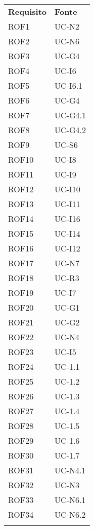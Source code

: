 \begin{longtable}{| p{5cm} | p{5cm} |}
		\rowcolor{LightBlue}
		\color{white}\bfseries Requisito & \color{white}\bfseries Fonte \\[0.25cm]
		\rowcolor{LightGray}
		ROF1 & UC-N2\\
		ROF2 & UC-N6\\
		\rowcolor{LightGray}
		ROF3 & UC-G4\\
		ROF4 & UC-I6\\
		\rowcolor{LightGray}
		ROF5 & UC-I6.1\\
		ROF6 & UC-G4\\
		\rowcolor{LightGray}
		ROF7 & UC-G4.1\\
		ROF8 & UC-G4.2\\
		\rowcolor{LightGray}
		ROF9 & UC-S6\\
		ROF10 & UC-I8\\
		\rowcolor{LightGray}
		ROF11 & UC-I9\\
		ROF12 & UC-I10\\
		\rowcolor{LightGray}
		ROF13 & UC-I11\\
		ROF14 & UC-I16\\
		\rowcolor{LightGray}
		ROF15 & UC-I14\\
		ROF16 & UC-I12\\
		\rowcolor{LightGray}
		ROF17 & UC-N7\\
		ROF18 & UC-R3\\
		\rowcolor{LightGray}
		ROF19 & UC-I7\\
		ROF20 & UC-G1\\
		\rowcolor{LightGray}
		ROF21 & UC-G2\\
		ROF22 & UC-N4\\
		\rowcolor{LightGray}
		ROF23 & UC-I5\\
		ROF24 & UC-1.1\\
		\rowcolor{LightGray}
		ROF25 & UC-1.2\\
		ROF26 & UC-1.3\\
		\rowcolor{LightGray}
		ROF27 & UC-1.4\\
		ROF28 & UC-1.5\\
		\rowcolor{LightGray}
		ROF29 & UC-1.6\\
		ROF30 & UC-1.7\\
		\rowcolor{LightGray}
		ROF31 & UC-N4.1\\
		ROF32 & UC-N3\\
		\rowcolor{LightGray}
		ROF33 & UC-N6.1\\
		ROF34 & UC-N6.2\\
		\rowcolor{LightGray}

\end{longtable}
